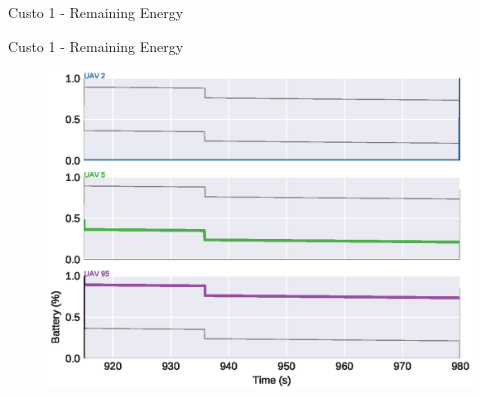 \begin{frame}{Custo 1 - Remaining Energy}
\begin{figure}[!htb]
                    \end{figure}
                \end{frame}\begin{frame}{Custo 1 - Remaining Energy}
                    \begin{figure}[!htb]
                        \includegraphics[width=\textwidth]{custo_1/uav_remaining_energy_980.eps}
                    \end{figure}
                \end{frame}
